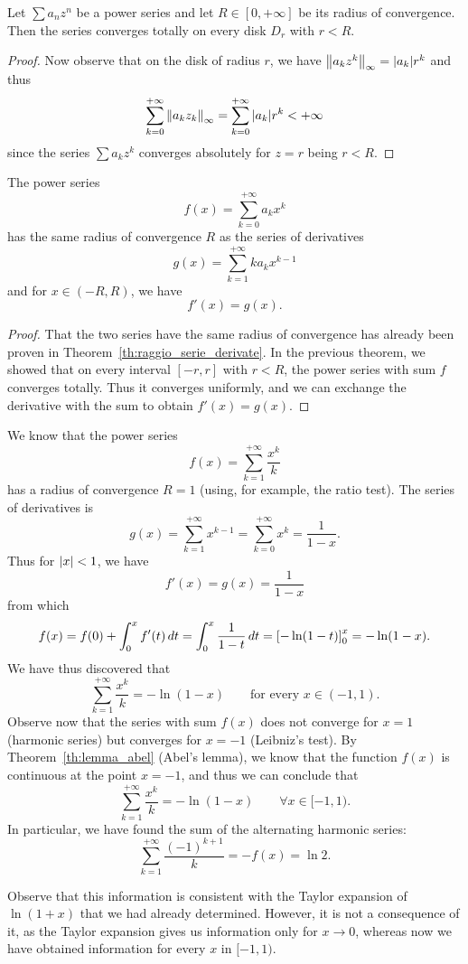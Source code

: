 \begin{theorem}
\label{th:convergenza_totale}
\mymark{***}%
Let $\sum a_n z^n$ be a power series and let $R\in[0,+\infty]$ be its radius of
convergence. Then the series converges totally on every disk $D_r$ with $r<R$.
\end{theorem}
%
\begin{proof}
Now observe that on the disk of radius $r$, we have ${\left\Vert a_k z^k\right\Vert}_\infty =
{\left|a_k\right|} r^k$ and thus
\[
\sum_{k=0}^{+\infty} {\left\Vert a_k z_k\right\Vert}_\infty
= \sum_{k=0}^{+\infty} {\left|a_k\right|}r^k < +\infty
\]
since the series $\sum a_k z^k$ converges absolutely for $z=r$ being $r<R$.
\end{proof}

\begin{corollary}
\label{cor:derivata_serie_potenze}
\mymark{**}
The power series
\[
  f(x) = \sum_{k=0}^{+\infty} a_k x^k
\]
has the same radius of convergence $R$ as the series of derivatives
\[
  g(x) = \sum_{k=1}^{+\infty} k a_k x^{k-1}
\]
and for $x\in (-R,R)$, we have
\[
  f'(x) = g(x).
\]
\end{corollary}
%
\begin{proof}
That the two series have the same radius of convergence has already been proven
in Theorem~\ref{th:raggio_serie_derivate}. In the previous theorem, we showed
that on every interval $[-r,r]$ with $r<R$, the power series with sum $f$
converges totally. Thus it converges uniformly, and we can exchange the
derivative with the sum to obtain $f'(x) = g(x)$.
\end{proof}

\begin{example}
We know that the power series
\[
f(x) = \sum_{k=1}^{+\infty} \frac{x^k}{k}
\]
has a radius of convergence $R=1$ (using, for example, the ratio test). The
series of derivatives is
\[
 g(x) = \sum_{k=1}^{+\infty} x^{k-1} = \sum_{k=0}^{+\infty}x^k = \frac{1}{1-x}.
\]
Thus for ${\left|x\right|}<1$, we have
\[
  f'(x) = g(x) = \frac{1}{1-x}
\]
from which
\[
 f(x) = f(0) + \int_0^x f'(t)\, dt = \int_0^x \frac{1}{1-t}\, dt
  = {\left[ -\ln(1-t) \right]}_0^x = -\ln(1-x).
\]
We have thus discovered that
\[
  \sum_{k=1}^{+\infty} \frac{x^k}{k} = - \ln (1-x) \qquad\text{for every $x\in (-1,1)$.}
\]
Observe now that the series with sum $f(x)$ does not converge for $x=1$
(harmonic series) but converges for $x=-1$ (Leibniz's test). By
Theorem~\ref{th:lemma_abel} (Abel's lemma), we know that the function $f(x)$ is
continuous at the point $x=-1$, and thus we can conclude that
\[
  \sum_{k=1}^{+\infty} \frac{x^k}{k} = -\ln(1-x)
  \qquad \forall x \in [-1,1).
\]
In particular, we have found the sum of the alternating harmonic series:
\[
  \sum_{k=1}^{+\infty} \frac{(-1)^{k+1}}{k} = - f(x) = \ln 2.
\]

Observe that this information is consistent with the Taylor expansion of
$\ln(1+x)$ that we had already determined. However, it is not a consequence of
it, as the Taylor expansion gives us information only for $x\to 0$, whereas now
we have obtained information for every $x$ in $[-1,1)$.
 \end{example}


